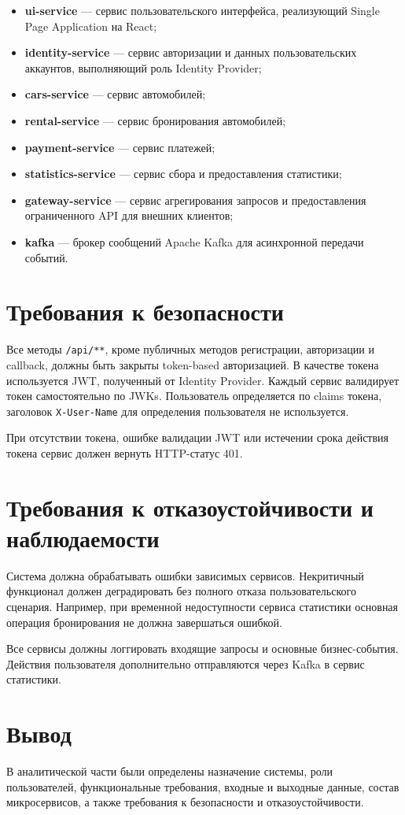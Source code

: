 \begin{itemize}
  \item \textbf{ui-service} --- сервис пользовательского интерфейса, реализующий Single Page Application на React;
  \item \textbf{identity-service} --- сервис авторизации и данных пользовательских аккаунтов, выполняющий роль Identity Provider;
  \item \textbf{cars-service} --- сервис автомобилей;
  \item \textbf{rental-service} --- сервис бронирования автомобилей;
  \item \textbf{payment-service} --- сервис платежей;
  \item \textbf{statistics-service} --- сервис сбора и предоставления статистики;
  \item \textbf{gateway-service} --- сервис агрегирования запросов и предоставления ограниченного API для внешних клиентов;
  \item \textbf{kafka} --- брокер сообщений Apache Kafka для асинхронной передачи событий.
\end{itemize}

\section{Требования к безопасности}

Все методы \texttt{/api/**}, кроме публичных методов регистрации, авторизации и callback, должны быть закрыты token-based авторизацией. В качестве токена используется JWT, полученный от Identity Provider. Каждый сервис валидирует токен самостоятельно по JWKs. Пользователь определяется по claims токена, заголовок \texttt{X-User-Name} для определения пользователя не используется.

При отсутствии токена, ошибке валидации JWT или истечении срока действия токена сервис должен вернуть HTTP-статус 401.

\section{Требования к отказоустойчивости и наблюдаемости}

Система должна обрабатывать ошибки зависимых сервисов. Некритичный функционал должен деградировать без полного отказа пользовательского сценария. Например, при временной недоступности сервиса статистики основная операция бронирования не должна завершаться ошибкой.

Все сервисы должны логгировать входящие запросы и основные бизнес-события. Действия пользователя дополнительно отправляются через Kafka в сервис статистики.

\section{Вывод}

В аналитической части были определены назначение системы, роли пользователей, функциональные требования, входные и выходные данные, состав микросервисов, а также требования к безопасности и отказоустойчивости.
